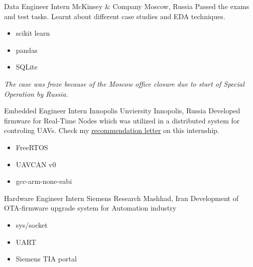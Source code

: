         {Data Engineer Intern}
        {McKinsey \& Company}
        {Moscow, Russia}
        {
        \newline
        Passed the exams and test tasks.
        Learnt about different case studies and EDA techniques.
        } 
        {
        \begin{itemize}
            \item scikit learn
            \item pandas
            \item SQLite
        \end{itemize}
        \textit{The case was froze because of the Moscow office closure due to start of Special Operation by Russia.}
        }
        

        {Embedded Engineer Intern}
        {Innopolis Unviersity}
        {Innopolis, Russia}
        {
        \newline
        Developed firmware for Real-Time Nodes which was utilized in a distributed system for controling UAVs. Check my \href{https://drive.google.com/file/d/1Msw5tk7niDSDpVlNeaLCsUIQxlgREYcV/view?usp=sharing}{\color{blue} recommendation letter} on this internship.
        }
        {
        \begin{itemize}
            \item FreeRTOS
            \item UAVCAN v0
            \item gcc-arm-none-eabi
        \end{itemize}
        }


        {Hardware Engineer Intern}
        {Siemens Research}
        {Mashhad, Iran}
        {
        \newline
        Development of OTA-firmware upgrade system for Automation industry} 
        {
        \begin{itemize}
            \item sys/socket
            \item UART
            \item Siemens TIA portal 
        \end{itemize}
        }

